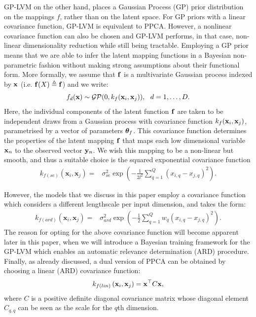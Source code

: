 \documentclass [10pt , a4paper]{article}
\begin{document}
\par GP-LVM on the other hand, places a Gaussian Process (GP) \cite{rasmussen-williams}  prior distribution on the
 mappings $f$, rather than on
 the latent space. For GP priors with a linear covariance function, GP-LVM is equivalent to PPCA. However, a nonlinear
 covariance function can also be chosen and GP-LVM performs, in that case, non-linear dimensionality reduction while 
still being tractable. Employing a GP prior means that we are able to infer the latent mapping functions in a Bayesian non-parametric
fashion without making strong assumptions about their functional form. More formally, we assume that $\mathbf{f}$
is a multivariate Gaussian process indexed by $\mathbf{x}$ (i.e. $\mathbf{f}(X) \triangleq \mathbf{f}$) and we write:
\begin{equation}
\label{gppriorf}
f_d(\bfx)  \sim  \mathcal{GP}(0, k_f(\bfx_i,\bfx_j)), \ \ d=1,\ldots,D.
\end{equation}
Here, the individual components of the latent function $\mathbf{f}$ are taken to be independent draws from a Gaussian
process with covariance function $k_f(\mathbf{x}_i,\mathbf{x}_j)$, parametrised by a vector of parameters $\boldsymbol \theta_f$. 
This covariance function determines the properties of the latent
mapping $\mathbf{f}$ that maps each low dimensional variable $\mathbf{x}_n$ to the
observed vector $\mathbf{y}_n$. We wish this mapping to be a non-linear but
smooth, and thus a suitable choice is the squared exponential
covariance function
\begin{align}
k_{f(se)} \left( \mathbf{x}_i, \mathbf{x}_j \right) = {} &  
		\sigma_{se}^2 \exp\left(
			- \frac{1}{2 l^2} \sum_{q=1}^{Q} \left(
                          \mathit{x_{i,q} - x_{j,q}} \right) ^2 \right).
\label{rbf}
\end{align}

\noindent However, the models that we
discuss in this paper employ a covariance function which considers a different lengthscale per input dimension, and takes the form:
\begin{align}
k_{f(ard)}  \left( \mathbf{x}_i, \mathbf{x}_j \right) = {} &  
		\sigma_{ard}^2 \exp \left(
			- \frac{1}{2} \sum_{q=1}^{Q} w_q \left(
                          \mathit{x_{i,q} - x_{j,q}} \right) ^2 \right).
\label{ard}
\end{align}
The reason for opting for the above covariance function will become apparent later in this paper, when we will introduce
a Bayesian training framework for the GP-LVM which enables an automatic relevance determination (ARD) procedure.
Finally, as already discussed, a dual version of PPCA can be obtained by choosing a linear (ARD) covariance function:
\begin{equation}
\label{linard}
k_{f(lin)} \left( \mathbf{x}_i, \mathbf{x}_j \right) = \mathbf{x}^{\top} C \mathbf{x},
\end{equation}
where $C$ is a positive definite diagonal covariance matrix whose diagonal element $C_{q,q}$ can be seen as the scale for
the $q$th dimension.
\end{document}
